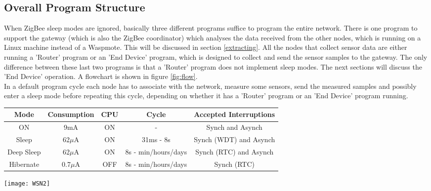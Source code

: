 \subsection{Overall Program Structure}
\label{program}
When ZigBee sleep modes are ignored, basically three different programs suffice to program the entire network. There is one program to support the gateway (which is also the ZigBee coordinator) which analyses the data received from the other nodes, which is running on a Linux machine instead of a Waspmote. This will be discussed in section \ref{extracting}. All the nodes that collect sensor data are either running a 'Router' program or an 'End Device' program, which is designed to collect and send the sensor samples to the gateway. The only difference between these last two programs is that a 'Router' program does not implement sleep modes. The next sections will discuss the 'End Device' operation. A flowchart is shown in figure \ref{fig:flow}.\\
In a default program cycle each node has to associate with the network, measure some sensors, send the measured samples and possibly enter a sleep mode before repeating this cycle, depending on whether it has a 'Router' program or an 'End Device' program running.\\ 
\begin{table*}[htbp]
\begin{center}
\begin{tabular}[htbp]{|c|c|c|c|c|}
\hline
\textbf{Mode} & \textbf{Consumption} & \textbf{CPU} & \textbf{Cycle} & \textbf{Accepted Interruptions}\\
\hline
ON & 9mA & ON & - & Synch and Asynch\\
\hline
Sleep & 62$\mu$A  & ON & 31ms - 8s & Synch (WDT) and Asynch\\
\hline
Deep Sleep & 62$\mu$A & ON & 8s - min/hours/days & Synch (RTC) and Asynch\\
\hline
Hibernate & 0.7$\mu$A & OFF & 8s - min/hours/days & Synch (RTC)\\
\hline
\end{tabular}
\caption{The operational modes of Libelium Waspmote V1.1}
\label{tab:cons1}
\end{center}
\end{table*}
\begin{figure*}[htbp]
\centering
\texttt{[image: WSN2]}
\caption{A flow chart of the Waspmote program for end devices}
\label{fig:flow}
\end{figure*}

